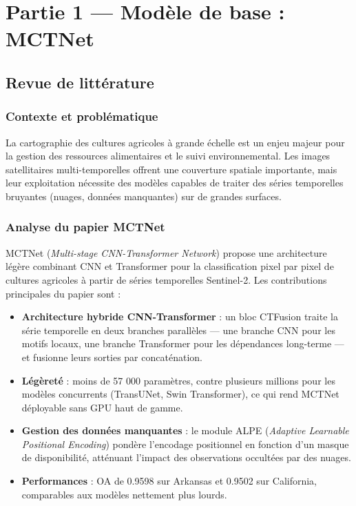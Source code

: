 
\chapter{Partie 1 — Modèle de base : MCTNet}
\label{chap:partie1}

\section{Revue de littérature}
\label{sec:litterature}

\subsection{Contexte et problématique}

La cartographie des cultures agricoles à grande échelle est un enjeu majeur
pour la gestion des ressources alimentaires et le suivi environnemental.
Les images satellitaires multi-temporelles offrent une couverture spatiale
importante, mais leur exploitation nécessite des modèles capables de traiter
des séries temporelles bruyantes (nuages, données manquantes) sur de grandes
surfaces.

\subsection{Analyse du papier MCTNet}

MCTNet (\textit{Multi-stage CNN-Transformer Network}) \cite{wang2024} propose
une architecture légère combinant CNN et Transformer pour la classification
pixel par pixel de cultures agricoles à partir de séries temporelles
Sentinel-2. Les contributions principales du papier sont :

\begin{itemize}
  \item \textbf{Architecture hybride CNN-Transformer} : un bloc CTFusion traite
        la série temporelle en deux branches parallèles — une branche CNN pour
        les motifs locaux, une branche Transformer pour les dépendances
        long-terme — et fusionne leurs sorties par concaténation.
  \item \textbf{Légèreté} : moins de 57 000 paramètres, contre plusieurs
        millions pour les modèles concurrents (TransUNet, Swin Transformer),
        ce qui rend MCTNet déployable sans GPU haut de gamme.
  \item \textbf{Gestion des données manquantes} : le module ALPE
        (\textit{Adaptive Learnable Positional Encoding}) pondère l'encodage
        positionnel en fonction d'un masque de disponibilité, atténuant
        l'impact des observations occultées par des nuages.
  \item \textbf{Performances} : OA de 0.9598 sur Arkansas et 0.9502 sur
        California, comparables aux modèles nettement plus lourds.
\end{itemize}

